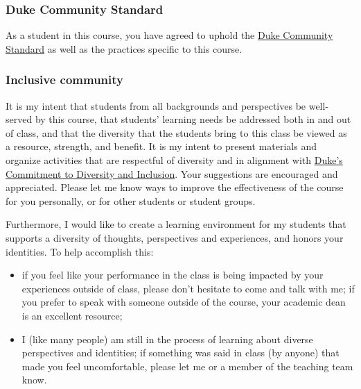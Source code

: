 \documentclass[
  letterpaper,
  DIV=11,
  numbers=noendperiod]{scrartcl}
\providecommand{\tightlist}{%
  \setlength{\itemsep}{0pt}\setlength{\parskip}{0pt}}
\begin{document}
\hypertarget{duke-community-standard}{%
\subsubsection{Duke Community Standard}\label{duke-community-standard}}

As a student in this course, you have agreed to uphold the
\href{https://studentaffairs.duke.edu/conduct/about-us/duke-community-standard}{Duke
Community Standard} as well as the practices specific to this course.

\hypertarget{inclusive-community}{%
\subsubsection{Inclusive community}\label{inclusive-community}}

It is my intent that students from all backgrounds and perspectives be
well-served by this course, that students' learning needs be addressed
both in and out of class, and that the diversity that the students bring
to this class be viewed as a resource, strength, and benefit. It is my
intent to present materials and organize activities that are respectful
of diversity and in alignment with
\href{https://provost.duke.edu/initiatives/commitment-to-diversity-and-inclusion}{Duke's
Commitment to Diversity and Inclusion}. Your suggestions are encouraged
and appreciated. Please let me know ways to improve the effectiveness of
the course for you personally, or for other students or student groups.

Furthermore, I would like to create a learning environment for my
students that supports a diversity of thoughts, perspectives and
experiences, and honors your identities. To help accomplish this:

\begin{itemize}
\tightlist
\item
  if you feel like your performance in the class is being impacted by
  your experiences outside of class, please don't hesitate to come and
  talk with me; if you prefer to speak with someone outside of the
  course, your academic dean is an excellent resource;
\item
  I (like many people) am still in the process of learning about diverse
  perspectives and identities; if something was said in class (by
  anyone) that made you feel uncomfortable, please let me or a member of
  the teaching team know.
\end{itemize}
\end{document}
